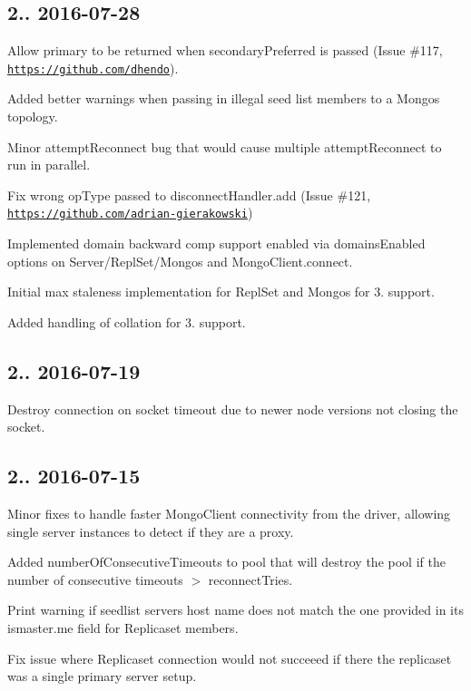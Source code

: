 \subsection*{2.. 2016-\/07-\/28 }


\begin{DoxyItemize}
\item Allow primary to be returned when secondary\+Preferred is passed (Issue \#117, \href{https://github.com/dhendo}{\tt https\+://github.\+com/dhendo}).
\item Added better warnings when passing in illegal seed list members to a Mongos topology.
\item Minor attempt\+Reconnect bug that would cause multiple attempt\+Reconnect to run in parallel.
\item Fix wrong op\+Type passed to disconnect\+Handler.\+add (Issue \#121, \href{https://github.com/adrian-gierakowski}{\tt https\+://github.\+com/adrian-\/gierakowski})
\item Implemented domain backward comp support enabled via domains\+Enabled options on Server/\+Repl\+Set/\+Mongos and Mongo\+Client.\+connect.
\item Initial max staleness implementation for Repl\+Set and Mongos for 3. support.
\item Added handling of collation for 3. support.
\end{DoxyItemize}

\subsection*{2.. 2016-\/07-\/19 }


\begin{DoxyItemize}
\item Destroy connection on socket timeout due to newer node versions not closing the socket.
\end{DoxyItemize}

\subsection*{2.. 2016-\/07-\/15 }


\begin{DoxyItemize}
\item Minor fixes to handle faster Mongo\+Client connectivity from the driver, allowing single server instances to detect if they are a proxy.
\item Added number\+Of\+Consecutive\+Timeouts to pool that will destroy the pool if the number of consecutive timeouts $>$ reconnect\+Tries.
\item Print warning if seedlist servers host name does not match the one provided in it\textquotesingle{}s ismaster.\+me field for Replicaset members.
\item Fix issue where Replicaset connection would not succeeed if there the replicaset was a single primary server setup.
\end{DoxyItemize}


